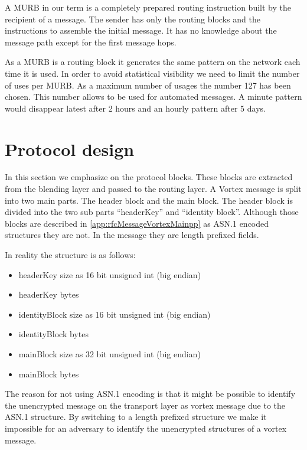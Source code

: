 A MURB in our term is a completely prepared routing instruction built by the recipient of a message. The sender has only the routing blocks and the instructions to assemble the initial message. It has no knowledge about the message path except for the first message hops.

As a MURB is a routing block it generates the same pattern on the network each time it is used. In order to avoid statistical visibility we need to limit the number of uses per MURB. As a maximum number of usages the number 127 has been chosen. This number allows to be used for automated messages. A minute pattern would disappear latest after 2 hours and an hourly pattern after 5 days.


\section{Protocol design}
In this section we emphasize on the protocol blocks. These blocks are extracted from the blending layer and passed to the routing layer. A Vortex message is split into two main parts. The header block and the main block. The header block is divided into the two sub parts ``headerKey'' and ``identity block''. Although those blocks are described in \ref{app:rfcMessageVortexMainpp} as ASN.1 encoded structures they are not. In the message they are length prefixed fields.

In reality the structure is as follows:
\begin{itemize}
	\item headerKey size as 16 bit unsigned int (big endian)
	\item headerKey bytes
	\item identityBlock size as 16 bit unsigned int (big endian)
	\item identityBlock bytes
	\item mainBlock size as 32 bit unsigned int (big endian)
	\item mainBlock bytes
\end{itemize}
The reason for not using ASN.1 encoding is that it might be possible to identify the unencrypted message on the transport layer as vortex message due to the ASN.1 structure. By switching to a length prefixed structure we make it impossible for an adversary to identify the unencrypted structures of a vortex message.



